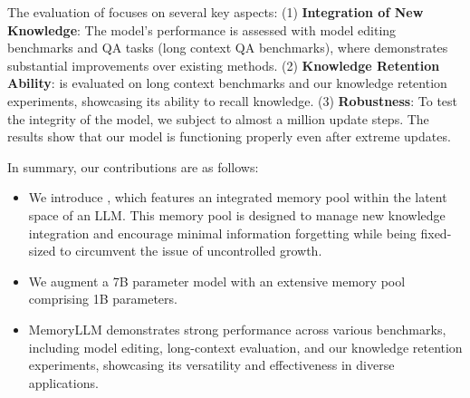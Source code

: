 The evaluation of \ours focuses on several key aspects: (1) \textbf{Integration of New Knowledge}: The model's performance is assessed with model editing benchmarks and QA tasks (long context QA benchmarks), where \ours demonstrates substantial improvements over existing methods. 
(2) \textbf{Knowledge Retention Ability}:
\ours is evaluated on long context benchmarks and our knowledge retention experiments, showcasing its ability to recall knowledge. 
(3) \textbf{Robustness}: To test the integrity of the model, we subject \ours to almost a million update steps. 
The results show that our model is functioning properly even after extreme updates. 

In summary, our contributions are as follows:
\begin{itemize}[nosep,leftmargin=*]
    \item We introduce \ours, which features an integrated memory pool within the latent space of an LLM. This memory pool is designed to manage new knowledge integration and encourage minimal information forgetting while being fixed-sized to circumvent the issue of uncontrolled growth.
    \item We augment a 7B parameter model with an extensive memory pool comprising 1B parameters. 
    \item MemoryLLM demonstrates strong performance across various benchmarks, including model editing, long-context evaluation, and our knowledge retention experiments, showcasing its versatility and effectiveness in diverse applications.
\end{itemize}
